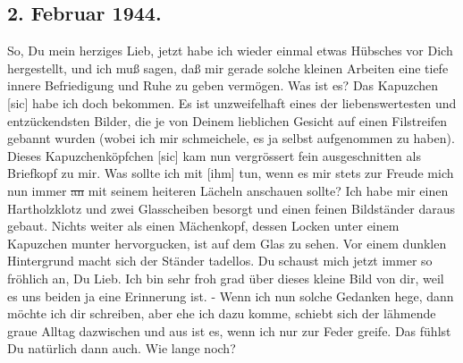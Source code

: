 \subsection{2. Februar 1944.}

So, Du mein herziges Lieb, jetzt habe ich wieder einmal etwas H\"{u}bsches vor Dich hergestellt, und ich mu{\ss} sagen, da{\ss} mir gerade solche kleinen Arbeiten eine tiefe innere Befriedigung und Ruhe zu geben verm\"{o}gen.
Was ist es?
Das Kapuzchen{\color{red} [sic] } habe ich doch bekommen.
Es ist unzweifelhaft eines der liebenswertesten und entz\"{u}ckendsten Bilder, die je von Deinem lieblichen Gesicht auf einen Filstreifen gebannt wurden (wobei ich mir schmeichele, es ja selbst aufgenommen zu haben).
Dieses Kapuzchenk\"{o}pfchen{\color{red} [sic] } kam nun vergr\"{o}ssert fein ausgeschnitten als Briefkopf zu mir.
Was sollte ich mit {\color{red} [ihm] } tun, wenn es mir stets zur Freude mich nun immer \st{an} mit seinem heiteren L\"{a}cheln anschauen sollte?
Ich habe mir einen Hartholzklotz und zwei Glasscheiben besorgt und einen feinen Bildst\"{a}nder daraus gebaut.
Nichts weiter als einen M\"{a}chenkopf, dessen Locken unter einem Kapuzchen munter hervorgucken, ist auf dem Glas zu sehen.
Vor einem dunklen Hintergrund macht sich der St\"{a}nder tadellos.
Du schaust mich jetzt immer so fr\"{o}hlich an, Du Lieb.
Ich bin sehr froh grad \"{u}ber dieses kleine Bild von dir, weil es uns beiden ja eine Erinnerung ist.
- Wenn ich nun solche Gedanken hege, dann m\"{o}chte ich dir schreiben, aber ehe ich dazu komme, schiebt sich der l\"{a}hmende graue Alltag dazwischen und aus ist es, wenn ich nur zur Feder greife.
Das f\"{u}hlst Du nat\"{u}rlich dann auch.
Wie lange noch?

\clearpage
